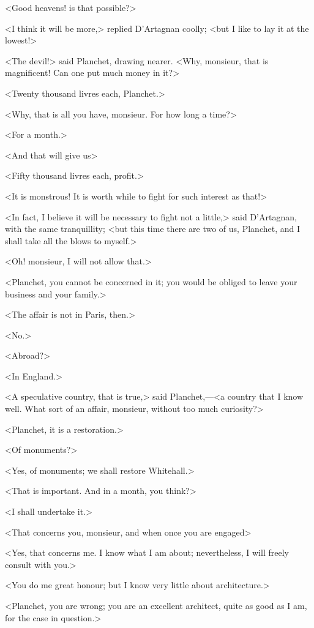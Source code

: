 <Good heavens! is that possible?>

<I think it will be more,> replied D'Artagnan coolly; <but I like to lay it at the lowest!>

<The devil!> said Planchet, drawing nearer. <Why, monsieur, that is magnificent! Can one put much money in it?>

<Twenty thousand livres each, Planchet.>

<Why, that is all you have, monsieur. For how long a time?>

<For a month.>

<And that will give us\longdash>

<Fifty thousand livres each, profit.>

<It is monstrous! It is worth while to fight for such interest as that!>

<In fact, I believe it will be necessary to fight not a little,> said D'Artagnan, with the same tranquillity; <but this time there are two of us, Planchet, and I shall take all the blows to myself.>

<Oh! monsieur, I will not allow that.>

<Planchet, you cannot be concerned in it; you would be obliged to leave your business and your family.>

<The affair is not in Paris, then.>

<No.>

<Abroad?>

<In England.>

<A speculative country, that is true,> said Planchet,—<a country that I know well. What sort of an affair, monsieur, without too much curiosity?>

<Planchet, it is a restoration.>

<Of monuments?>

<Yes, of monuments; we shall restore Whitehall.>

<That is important. And in a month, you think?>

<I shall undertake it.>

<That concerns you, monsieur, and when once you are engaged\longdash>

<Yes, that concerns me. I know what I am about; nevertheless, I will freely consult with you.>

<You do me great honour; but I know very little about architecture.>

<Planchet, you are wrong; you are an excellent architect, quite as good as I am, for the case in question.>

